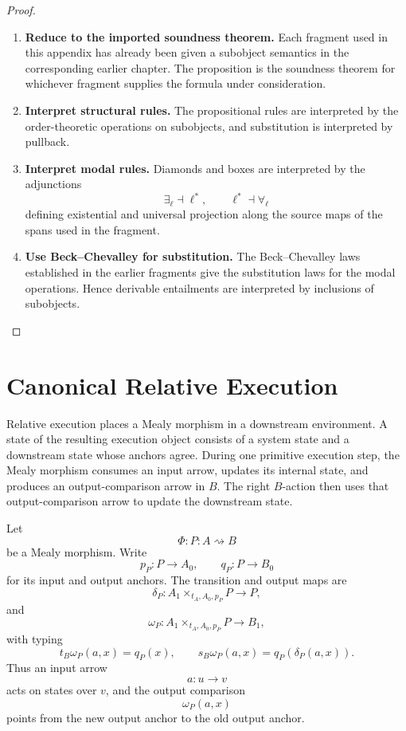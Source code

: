\begin{proof}
\leavevmode
\begin{enumerate}
  \item \textbf{Reduce to the imported soundness theorem.}
  Each fragment used in this appendix has already been given a subobject
  semantics in the corresponding earlier chapter.  The proposition is the
  soundness theorem for whichever fragment supplies the formula under
  consideration.

  \item \textbf{Interpret structural rules.}
  The propositional rules are interpreted by the order-theoretic operations
  on subobjects, and substitution is interpreted by pullback.

  \item \textbf{Interpret modal rules.}
  Diamonds and boxes are interpreted by the adjunctions
  \[
    \exists_{\ell}\dashv \ell^*,
    \qquad
    \ell^*\dashv \forall_{\ell}
  \]
  defining existential and universal projection along the source maps of the
  spans used in the fragment.

  \item \textbf{Use Beck--Chevalley for substitution.}
  The Beck--Chevalley laws established in the earlier fragments give the
  substitution laws for the modal operations.  Hence derivable entailments are
  interpreted by inclusions of subobjects.
\end{enumerate}
\end{proof}

\section{Canonical Relative Execution}
\label{sec:canonical-relative-execution}

Relative execution places a Mealy morphism in a downstream environment.  A
state of the resulting execution object consists of a system state and a
downstream state whose anchors agree.  During one primitive execution step,
the Mealy morphism consumes an input arrow, updates its internal state, and
produces an output-comparison arrow in \(B\).  The right \(B\)-action then
uses that output-comparison arrow to update the downstream state.

Let
\[
  \Phi:P:A\rightsquigarrow B
\]
be a Mealy morphism.  Write
\[
  p_P:P\to A_0,
  \qquad
  q_P:P\to B_0
\]
for its input and output anchors.  The transition and output maps are
\[
  \delta_P:
  A_1\times_{t_A,A_0,p_P}P\longrightarrow P,
\]
and
\[
  \omega_P:
  A_1\times_{t_A,A_0,p_P}P\longrightarrow B_1,
\]
with typing
\[
  t_B\omega_P(a,x)=q_P(x),
  \qquad
  s_B\omega_P(a,x)=q_P(\delta_P(a,x)).
\]
Thus an input arrow
\[
  a:u\to v
\]
acts on states over \(v\), and the output comparison
\[
  \omega_P(a,x)
\]
points from the new output anchor to the old output anchor.

